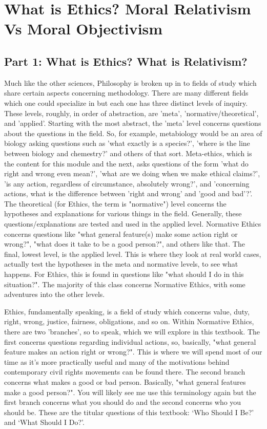 \part{What is Ethics? Moral Relativism Vs Moral Objectivism}
\label{ch.modone}
\chapter{Part 1: What is Ethics? What is Relativism?}
Much like the other sciences, Philosophy is broken up in to fields of study which share certain aspects concerning methodology. There are many different fields which one could specialize in but each one has three distinct levels of inquiry. These levels, roughly, in order of abstraction, are 'meta', 'normative/theoretical', and 'applied'. Starting with the most abstract, the 'meta' level concerns questions about the questions in the field. So, for example, metabiology would be an area of biology asking questions such as 'what exactly is a species?', 'where is the line between biology and chemestry?' and others of that sort. Meta-ethics, which is the content for this module and the next, asks questions of the form 'what do right and wrong even mean?', 'what are we doing when we make ethical claims?', 'is any action, regardless of circumstance, absolutely wrong?', and 'concerning actions, what is the difference between 'right and wrong' and 'good and bad'?'. The theoretical (for Ethics, the term is "normative") level concerns the hypotheses and explanations for various things in the field. Generally, these questions/explanations are tested and used in the applied level. Normative Ethics concerns questions like "what general feature(s) make some action right or wrong?", "what does it take to be a good person?", and others like that.  The final, lowest level, is the applied level. This is where they look at real world cases, actually test the hypotheses in the meta and normative levels, to see what happens. For Ethics, this is found in questions like "what should I do in this situation?". The majority of this class concerns Normative Ethics, with some adventures into the other levels. 

Ethics, fundamentally speaking, is a field of study which concerns value, duty, right, wrong, justice, fairness, obligations, and so on.  Within Normative Ethics, there are two 'branches', so to speak, which we will explore in this textbook. The first concerns questions regarding individual actions, so, basically, "what general feature makes an action right or wrong?". This is where we will spend most of our time as it's more practically useful and many of the motivations behind contemporary civil rights movements can be found there. The second branch concerns what makes a good or bad person. Basically, "what general features make a good person?". You will likely see me use this terminology again but the first branch concerns what you should do and the second concerns who you should be. These are the titular questions of this textbook: `Who Should I Be?' and `What Should I Do?'.

